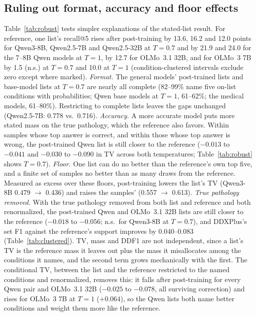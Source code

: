 \documentclass[wcp]{jmlr}
\begin{document}
\subsection{Ruling out format, accuracy and floor effects}\label{sec:statedchecks}
Table~\ref{tab:robust} tests simpler explanations of the stated-list result. For reference, one list's recall@5 rises after post-training by 13.6, 16.2 and 12.0 points for Qwen3-8B, Qwen2.5-7B and Qwen2.5-32B at $T{=}0.7$ and by 21.9 and 24.0 for the 7--8B Qwen models at $T{=}1$, by 12.7 for OLMo~3.1 32B, and for OLMo~3 7B by 1.5 (n.s.) at $T{=}0.7$ and 10.0 at $T{=}1$ (condition-clustered intervals exclude zero except where marked).
\emph{Format.} The general models' post-trained lists and base-model lists at $T{=}0.7$ are nearly all complete (82--99\% name five on-list conditions with probabilities; Qwen base models at $T{=}1$, 61--62\%; the medical models, 61--80\%). Restricting to complete lists leaves the gaps unchanged (Qwen2.5-7B: 0.778 vs.\ 0.716).
\emph{Accuracy.} A more accurate model puts more stated mass on the true pathology, which the reference also favors. Within samples whose top answer is correct, and within those whose top answer is wrong, the post-trained Qwen list is still closer to the reference ($-0.013$ to $-0.041$ and $-0.030$ to $-0.090$ in TV across both temperatures; Table~\ref{tab:robust} shows $T{=}0.7$).
\emph{Floor.} One list can do no better than the reference's own top five, and a finite set of samples no better than as many draws from the reference. Measured as excess over these floors, post-training lowers the list's TV (Qwen3-8B 0.479 $\rightarrow$ 0.436) and raises the samples' (0.557 $\rightarrow$ 0.613).
\emph{True pathology removed.} With the true pathology removed from both list and reference and both renormalized, the post-trained Qwen and OLMo~3.1 32B lists are still closer to the reference ($-0.018$ to $-0.056$; n.s.\ for Qwen3-8B at $T{=}0.7$), and DDXPlus's set F1 against the reference's support improves by 0.040--0.083 (Table~\ref{tab:clustered}). TV, mass and DDF1 are not independent, since a list's TV is the reference mass it leaves out plus the mass it misallocates among the conditions it names, and the second term grows mechanically with the first. The conditional TV, between the list and the reference restricted to the named conditions and renormalized, removes this: it falls after post-training for every Qwen pair and OLMo~3.1 32B ($-0.025$ to $-0.078$, all surviving correction) and rises for OLMo~3 7B at $T{=}1$ ($+0.064$), so the Qwen lists both name better conditions and weight them more like the reference.
\end{document}
